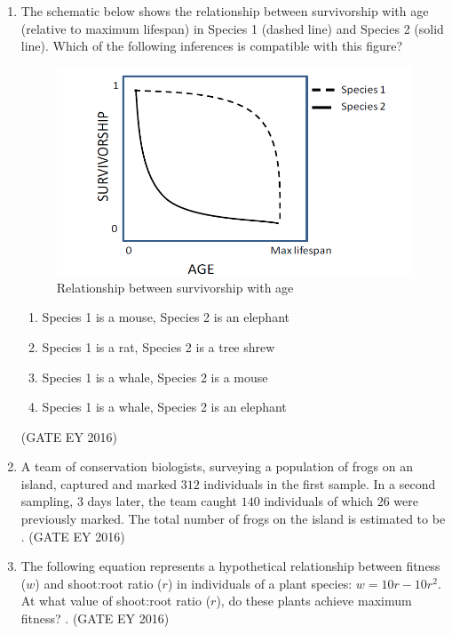 \documentclass[journal]{IEEEtran}
\begin{document}
\begin{enumerate}
\item The schematic below shows the relationship between survivorship with age (relative to maximum lifespan) in Species 1 (dashed line) and Species 2 (solid line). Which of the following inferences is compatible with this figure? 
\begin{figure}[!ht]
    \centering
    \includegraphics[width=0.7\columnwidth]{figs/Q-52.png}
    \caption{Relationship between survivorship with age}
    \label{Fig.7}
\end{figure}
\begin{enumerate}
    \item Species 1 is a mouse, Species 2 is an elephant
    \item Species 1 is a rat, Species 2 is a tree shrew
    \item Species 1 is a whale, Species 2 is a mouse
    \item Species 1 is a whale, Species 2 is an elephant
\end{enumerate}
\hfill{(GATE EY 2016)}

\item A team of conservation biologists, surveying a population of frogs on an island, captured and marked $312$ individuals in the first sample. In a second sampling, $3$ days later, the team caught $140$ individuals of which $26$ were previously marked. The total number of frogs on the island is estimated to be \underline{\hspace{3cm}}.
\hfill{(GATE EY 2016)}
\bigskip
 
\item The following equation represents a hypothetical relationship between fitness ($w$) and shoot:root ratio ($r$) in individuals of a plant species: $w = 10r - 10r^2$. At what value of shoot:root ratio ($r$), do these plants achieve maximum fitness? \underline{\hspace{3cm}}.
\hfill{(GATE EY 2016)}
\bigskip
 

\end{enumerate}
\end{document}
